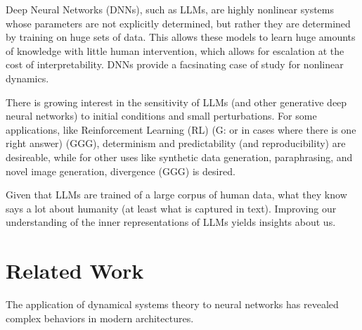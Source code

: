 \documentclass[a4paper,12pt]{article}
\begin{document}
Deep Neural Networks (DNNs), such as LLMs, are highly nonlinear systems whose parameters are not explicitly determined, but rather they are determined by training on huge sets of data.
This allows these models to learn huge amounts of knowledge with little human intervention, which allows for escalation at the cost of interpretability.
DNNs provide a facsinating case of study for nonlinear dynamics.

There is growing interest in the sensitivity of LLMs (and other generative deep neural networks) to initial conditions and small perturbations. For some applications, like Reinforcement Learning (RL) (G: or in cases where there is one right answer) (GGG), determinism and predictability (and reproducibility) are desireable, while for other uses like synthetic data generation, paraphrasing, and novel image generation, divergence (GGG) is desired.

Given that LLMs are trained of a large corpus of human data, what they know says a lot about humanity (at least what is captured in text). Improving our understanding of the inner representations of LLMs yields insights about us.


\section{Related Work}


The application of dynamical systems theory to neural networks has revealed complex behaviors in modern architectures.  
\end{document}
